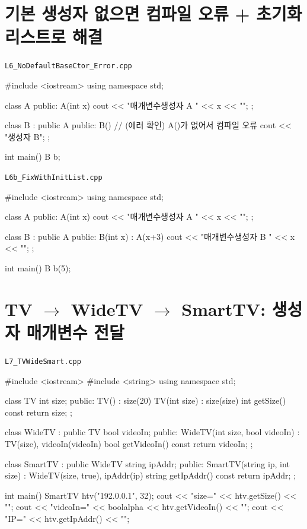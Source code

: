 \documentclass[11pt,a4paper]{article}
\newcommand{\filetag}[1]{\texttt{\color{Accent}#1}}
\begin{document}
\section{기본 생성자 없으면 컴파일 오류 + 초기화 리스트로 해결}
\noindent\filetag{L6\_NoDefaultBaseCtor\_Error.cpp}
\begin{cppcode}
#include <iostream>
using namespace std;

class A {
public:
    A(int x) { cout << "매개변수생성자 A " << x << "\n"; }
};

class B : public A {
public:
    B() {
        // (에러 확인) A()가 없어서 컴파일 오류
        cout << "생성자 B\n";
    }
};

int main() { B b; }
\end{cppcode}

\noindent\filetag{L6b\_FixWithInitList.cpp}
\begin{cppcode}
#include <iostream>
using namespace std;

class A {
public:
    A(int x) { cout << "매개변수생성자 A " << x << "\n"; }
};

class B : public A {
public:
    B(int x) : A(x+3) {
        cout << "매개변수생성자 B " << x << "\n";
    }
};

int main() { B b(5); }
\end{cppcode}

\section{TV $\rightarrow$ WideTV $\rightarrow$ SmartTV: 생성자 매개변수 전달}
\noindent\filetag{L7\_TVWideSmart.cpp}
\begin{cppcode}
#include <iostream>
#include <string>
using namespace std;

class TV {
    int size;
public:
    TV() : size(20) {}
    TV(int size) : size(size) {}
    int getSize() const { return size; }
};

class WideTV : public TV {
    bool videoIn;
public:
    WideTV(int size, bool videoIn) : TV(size), videoIn(videoIn) {}
    bool getVideoIn() const { return videoIn; }
};

class SmartTV : public WideTV {
    string ipAddr;
public:
    SmartTV(string ip, int size) : WideTV(size, true), ipAddr(ip) {}
    string getIpAddr() const { return ipAddr; }
};

int main() {
    SmartTV htv("192.0.0.1", 32);
    cout << "size=" << htv.getSize() << "\n";
    cout << "videoIn=" << boolalpha << htv.getVideoIn() << "\n";
    cout << "IP=" << htv.getIpAddr() << "\n";
}
\end{cppcode}
\end{document}
